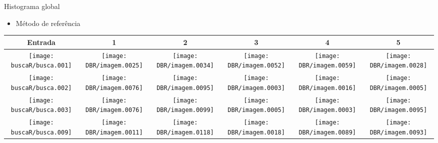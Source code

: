 \documentclass[
    style=paintings,
    paper=screen,
    blackslide,
    nopagebreaks,
    fleqn
]{powerdot}
\begin{document}
\begin{slide}{Histograma global}
\begin{itemize}[type=1]
\item <1-> Método de referência
\end{itemize}
\vspace{-0.8cm}
\begin{table}[H]
\begin{center}
\begin{tabular}{c|ccccc}
\hline 
Entrada & 1 & 2 & 3 & 4 & 5\tabularnewline
\hline
\texttt{[image: buscaR/busca.001]} & 
\texttt{[image: DBR/imagem.0025]} & 
\texttt{[image: DBR/imagem.0034]} & 
\texttt{[image: DBR/imagem.0052]} & 
\texttt{[image: DBR/imagem.0059]} &
\texttt{[image: DBR/imagem.0028]} 
\tabularnewline
\hline 
\texttt{[image: buscaR/busca.002]} & 
\texttt{[image: DBR/imagem.0076]} & 
\texttt{[image: DBR/imagem.0095]} & 
\texttt{[image: DBR/imagem.0003]} & 
\texttt{[image: DBR/imagem.0016]} &
\texttt{[image: DBR/imagem.0005]} 
\tabularnewline
\hline 
\texttt{[image: buscaR/busca.003]} & 
\texttt{[image: DBR/imagem.0076]} & 
\texttt{[image: DBR/imagem.0099]} & 
\texttt{[image: DBR/imagem.0005]} & 
\texttt{[image: DBR/imagem.0003]} &
\texttt{[image: DBR/imagem.0095]} 
\tabularnewline
\hline 
\texttt{[image: buscaR/busca.009]} & 
\texttt{[image: DBR/imagem.0011]} & 
\texttt{[image: DBR/imagem.0118]} & 
\texttt{[image: DBR/imagem.0018]} & 
\texttt{[image: DBR/imagem.0089]} &
\texttt{[image: DBR/imagem.0093]} 
\tabularnewline
\hline 
\end{tabular}
\end{center}
\end{table}
\end{slide}
\end{document}
